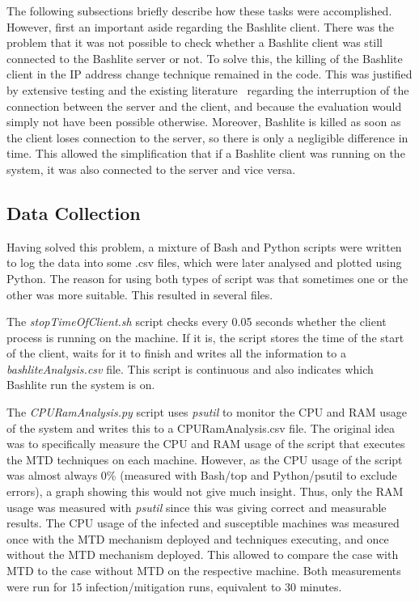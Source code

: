The following subsections briefly describe how these tasks were accomplished. However, first an important aside regarding the Bashlite client. There was the problem that it was not possible to check whether a Bashlite client was still connected to the Bashlite server or not. To solve this, the killing of the Bashlite client in the IP address change technique remained in the code. This was justified by extensive testing and the existing literature~\cite{article:vonderAssen} regarding the interruption of the connection between the server and the client, and because the evaluation would simply not have been possible otherwise. Moreover, Bashlite is killed as soon as the client loses connection to the server, so there is only a negligible difference in time. This allowed the simplification that if a Bashlite client was running on the system, it was also connected to the server and vice versa. 


\subsection{Data Collection} \label{section:gatheringData}
Having solved this problem, a mixture of Bash and Python scripts were written to log the data into some .csv files, which were later analysed and plotted using Python. The reason for using both types of script was that sometimes one or the other was more suitable. This resulted in several files. 

The \textit{stopTimeOfClient.sh} script checks every 0.05 seconds whether the client process is running on the machine. If it is, the script stores the time of the start of the client, waits for it to finish and writes all the information to a \textit{bashliteAnalysis.csv} file. This script is continuous and also indicates which Bashlite run the system is on.

The \textit{CPURamAnalysis.py} script uses \textit{psutil} to monitor the CPU and RAM usage of the system and writes this to a CPURamAnalysis.csv file. The original idea was to specifically measure the CPU and RAM usage of the script that executes the MTD techniques on each machine. However, as the CPU usage of the script was almost always 0\% (measured with Bash/top and Python/psutil to exclude errors), a graph showing this would not give much insight. Thus, only the RAM usage was measured with \textit{psutil} since this was giving correct and measurable results. The CPU usage of the infected and susceptible machines was measured once with the MTD mechanism deployed and techniques executing, and once without the MTD mechanism deployed. This allowed to compare the case with MTD to the case without MTD on the respective machine. Both measurements were run for 15 infection/mitigation runs, equivalent to 30 minutes.  


